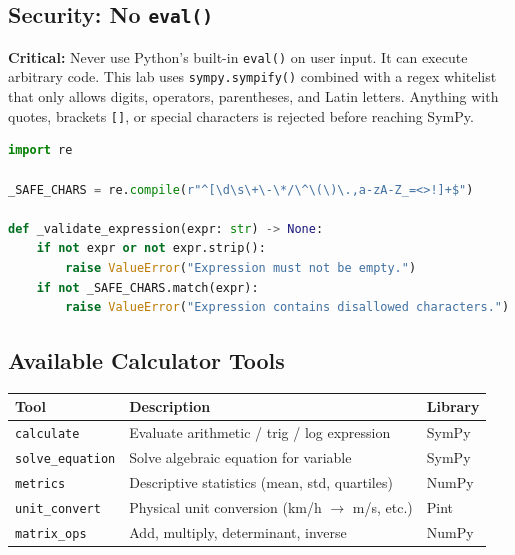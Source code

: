 \documentclass[11pt,a4paper]{article}
\begin{document}
\subsection{Security: No \texttt{eval()}}

\begin{warnbox}
\textbf{Critical:} Never use Python's built-in \texttt{eval()} on user input.
It can execute arbitrary code. This lab uses \texttt{sympy.sympify()} combined
with a regex whitelist that only allows digits, operators, parentheses, and
Latin letters. Anything with quotes, brackets \texttt{[]}, or special characters
is rejected before reaching SymPy.
\end{warnbox}

\begin{lstlisting}[language=Python, caption={Security validation}]
import re

_SAFE_CHARS = re.compile(r"^[\d\s\+\-\*/\^\(\)\.,a-zA-Z_=<>!]+$")

def _validate_expression(expr: str) -> None:
    if not expr or not expr.strip():
        raise ValueError("Expression must not be empty.")
    if not _SAFE_CHARS.match(expr):
        raise ValueError("Expression contains disallowed characters.")
\end{lstlisting}

\subsection{Available Calculator Tools}

\begin{center}
\begin{tabularx}{\linewidth}{lXl}
\toprule
\textbf{Tool} & \textbf{Description} & \textbf{Library} \\
\midrule
\texttt{calculate}     & Evaluate arithmetic / trig / log expression & SymPy \\
\texttt{solve\_equation} & Solve algebraic equation for variable & SymPy \\
\texttt{metrics}       & Descriptive statistics (mean, std, quartiles) & NumPy \\
\texttt{unit\_convert} & Physical unit conversion (km/h $\rightarrow$ m/s, etc.) & Pint \\
\texttt{matrix\_ops}   & Add, multiply, determinant, inverse & NumPy \\
\bottomrule
\end{tabularx}
\end{center}
\end{document}
